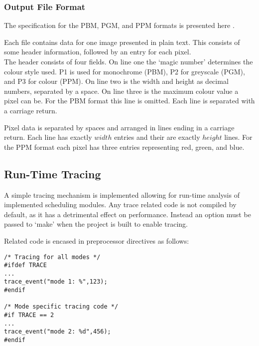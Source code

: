 

\subsubsection*{Output File Format}

The specification for the PBM, PGM, and PPM formats is presented here \cite{ppmspec}.

Each file contains data for one image presented in plain text. This consists of some header information, 
followed by an entry for each pixel. 
\\



The header consists of four fields. On line one the `magic number' determines the colour style used.
P1 is used for monochrome (PBM), P2 for greyscale (PGM), and P3 for colour (PPM).
On line two is the width and height as decimal numbers, separated by a space.
On line three is the maximum colour value a pixel can be. For the PBM format this line is omitted.
Each line is separated with a carriage return. 

Pixel data is separated by spaces and arranged in lines ending in a carriage return. 
Each line has exactly \(width\) entries and their are exactly \(height\) lines.
For the PPM format each pixel has three entries representing red, green, and blue.

\subsection{Run-Time Tracing}
\label{sec:traceimp}

A simple tracing mechanism is implemented allowing for run-time analysis of implemented scheduling modules.
Any trace related code is not compiled by default, as it has a detrimental effect on performance. 
Instead an option must be passed to `make' when the project is built to enable tracing.

Related code is encased in preprocessor directives as follows:

\begin{lstlisting}
/* Tracing for all modes */
#ifdef TRACE
...
trace_event("mode 1: %",123);
#endif

/* Mode specific tracing code */
#if TRACE == 2
...
trace_event("mode 2: %d",456);
#endif 
\end{lstlisting}

